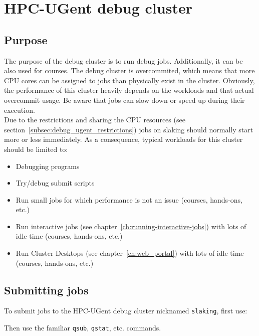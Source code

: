 \chapter{HPC-UGent debug cluster}
\label{ch:debug_ugent}


\section{Purpose}
\label{sec:debug_ugent_pupose}
The purpose of the debug cluster is to run debug jobs. Additionally, it can be also used for courses. 
The debug cluster is overcommited, which means that more CPU cores can be
assigned to jobs than physically exist in the cluster. Obviously, the performance of this cluster
heavily depends on the workloads and that actual overcommit usage. Be aware that jobs can slow
down or speed up during their execution.
\\ Due to the restrictions and sharing the CPU resources (see section~\ref{subsec:debug_ugent_restrictions}) 
jobs on slaking should normally start more or less immediately. As a consequence,
typical workloads for this cluster should be limited to:
\begin{itemize}
  \item  Debugging programs
  \item  Try/debug submit scripts
  \item  Run small jobs for which performance is not an issue (courses, hands-ons, etc.)
  \item  Run interactive jobs (see chapter~\ref{ch:running-interactive-jobs}) with lots of idle time
         (courses, hands-ons, etc.) 
  \item  Run Cluster Desktops (see chapter~\ref{ch:web_portal}) with lots of idle time
         (courses, hands-ons, etc.)
\end{itemize} 

\section{Submitting jobs}
\label{sec:debug_ugent_jobs}

To submit jobs to the HPC-UGent debug cluster nicknamed \lstinline|slaking|, first use:

\begin{prompt}
\end{prompt}

Then use the familiar \lstinline|qsub|, \lstinline|qstat|, etc. commands.

